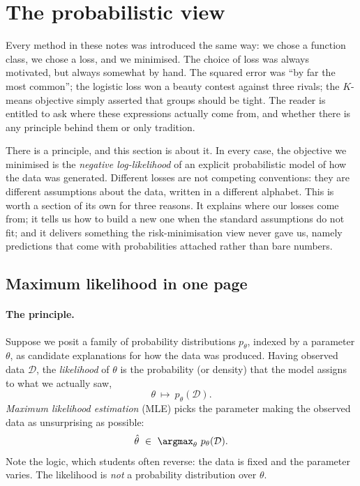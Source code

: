 \section{The probabilistic view}
\label{sec:probabilistic}

Every method in these notes was introduced the same way: we chose a function class, we
chose a loss, and we minimised. The choice of loss was always motivated, but always
somewhat by hand. The squared error was ``by far the most common''; the logistic loss
won a beauty contest against three rivals; the $K$-means objective simply asserted that
groups should be tight. The reader is entitled to ask where these expressions actually
come from, and whether there is any principle behind them or only tradition.

There is a principle, and this section is about it. In every case, the objective we
minimised is the \emph{negative log-likelihood} of an explicit probabilistic model of
how the data was generated. Different losses are not competing conventions: they are
different assumptions about the data, written in a different alphabet. This is worth a
section of its own for three reasons. It explains where our losses come from; it tells
us how to build a new one when the standard assumptions do not fit; and it delivers
something the risk-minimisation view never gave us, namely predictions that come with
probabilities attached rather than bare numbers.

\subsection{Maximum likelihood in one page}
\label{subsec:mle}

\paragraph{The principle.}
Suppose we posit a family of probability distributions $p_\theta$, indexed by a
parameter $\theta$, as candidate explanations for how the data was produced. Having
observed data $\mathcal{D}$, the \emph{likelihood} of $\theta$ is the probability (or
density) that the model assigns to what we actually saw,
\[
\theta \ \longmapsto \ p_\theta(\mathcal{D}) .
\]
\emph{Maximum likelihood estimation} (MLE) picks the parameter making the observed data
as unsurprising as possible:
\[
\hat\theta \ \in \ \argmax_{\theta} \ p_\theta(\mathcal{D}) .
\]
Note the logic, which students often reverse: the data is fixed and the parameter
varies. The likelihood is \emph{not} a probability distribution over $\theta$.

